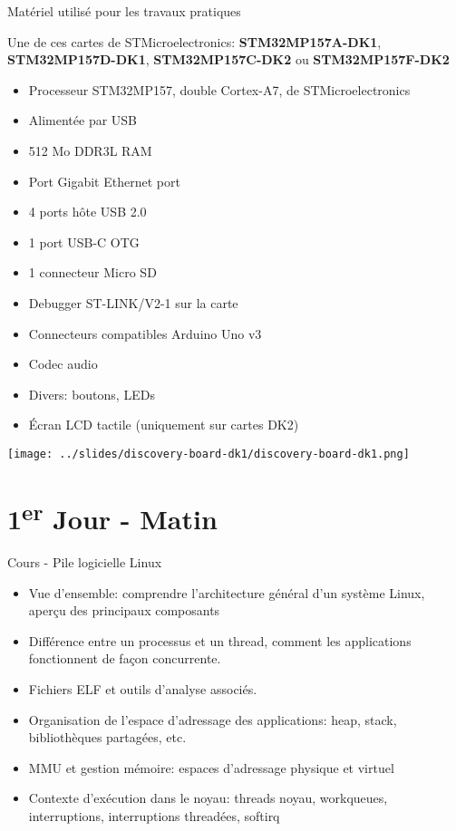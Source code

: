 \documentclass[a4paper,12pt,obeyspaces,spaces,hyphens]{article}
\begin{document}
\feagendatwocolumn
{Matériel utilisé pour les travaux pratiques}
{
  Une de ces cartes de STMicroelectronics: {\bf
  STM32MP157A-DK1}, {\bf STM32MP157D-DK1}, {\bf STM32MP157C-DK2} ou
  {\bf STM32MP157F-DK2}
  \begin{itemize}
  \item Processeur STM32MP157, double Cortex-A7, de STMicroelectronics
  \item Alimentée par USB
  \item 512 Mo DDR3L RAM
  \item Port Gigabit Ethernet port
  \item 4 ports hôte USB 2.0
  \item 1 port USB-C OTG
  \item 1 connecteur Micro SD
  \item Debugger ST-LINK/V2-1 sur la carte
  \item Connecteurs compatibles Arduino Uno v3
  \item Codec audio
  \item Divers: boutons, LEDs
  \item Écran LCD tactile (uniquement sur cartes DK2)
  \end{itemize}
}{}
{
  \begin{center}
    \texttt{[image: ../slides/discovery-board-dk1/discovery-board-dk1.png]}
  \end{center}
}

\section{1\textsuperscript{er} Jour - Matin}

\feagendaonecolumn
{Cours - Pile logicielle Linux}
{
  \begin{itemize}
  \item Vue d'ensemble: comprendre l'architecture général d'un système
    Linux, aperçu des principaux composants
  \item Différence entre un processus et un thread, comment les
    applications fonctionnent de façon concurrente.
  \item Fichiers ELF et outils d'analyse associés.
  \item Organisation de l'espace d'adressage des applications: heap,
    stack, bibliothèques partagées, etc.
  \item MMU et gestion mémoire: espaces d'adressage physique et
    virtuel
  \item Contexte d'exécution dans le noyau: threads noyau, workqueues,
    interruptions, interruptions threadées, softirq
  \end{itemize}
}
\end{document}
